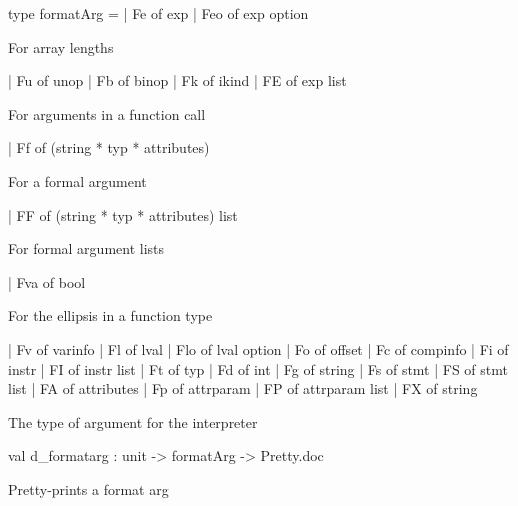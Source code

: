\documentclass[11pt]{article}
\begin{document}
\label{type:Cil.formatArg}\begin{ocamldoccode}
type formatArg =
  | Fe of exp
  | Feo of exp option
\end{ocamldoccode}
\begin{ocamldoccomment}
For array lengths
\end{ocamldoccomment}
\begin{ocamldoccode}
  | Fu of unop
  | Fb of binop
  | Fk of ikind
  | FE of exp list
\end{ocamldoccode}
\begin{ocamldoccomment}
For arguments in a function call
\end{ocamldoccomment}
\begin{ocamldoccode}
  | Ff of (string * typ * attributes)
\end{ocamldoccode}
\begin{ocamldoccomment}
For a formal argument
\end{ocamldoccomment}
\begin{ocamldoccode}
  | FF of (string * typ * attributes) list
\end{ocamldoccode}
\begin{ocamldoccomment}
For formal argument lists
\end{ocamldoccomment}
\begin{ocamldoccode}
  | Fva of bool
\end{ocamldoccode}
\begin{ocamldoccomment}
For the ellipsis in a function type
\end{ocamldoccomment}
\begin{ocamldoccode}
  | Fv of varinfo
  | Fl of lval
  | Flo of lval option
  | Fo of offset
  | Fc of compinfo
  | Fi of instr
  | FI of instr list
  | Ft of typ
  | Fd of int
  | Fg of string
  | Fs of stmt
  | FS of stmt list
  | FA of attributes
  | Fp of attrparam
  | FP of attrparam list
  | FX of string
\end{ocamldoccode}
\begin{ocamldocdescription}
The type of argument for the interpreter


\end{ocamldocdescription}




\label{val:Cil.d-underscoreformatarg}\begin{ocamldoccode}
val d_formatarg : unit -> formatArg -> Pretty.doc
\end{ocamldoccode}
\begin{ocamldocdescription}
Pretty-prints a format arg


\end{ocamldocdescription}
\end{document}
